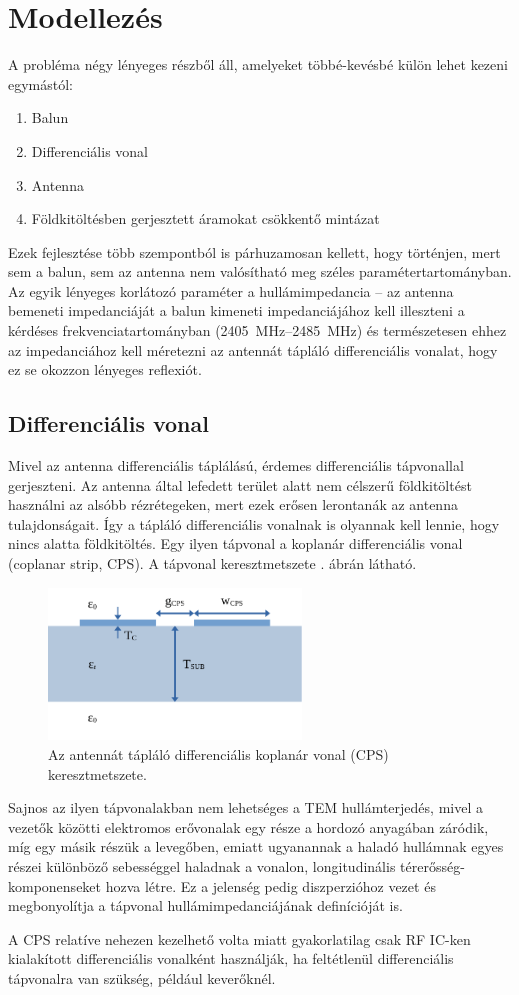 \chapter{Modellezés}
A probléma négy lényeges részből áll, amelyeket többé-kevésbé külön lehet kezeni egymástól:
\begin{enumerate}
	\item Balun
	\item Differenciális vonal
	\item Antenna
	\item Földkitöltésben gerjesztett áramokat csökkentő mintázat
\end{enumerate}
\par Ezek fejlesztése több szempontból is párhuzamosan kellett, hogy történjen, mert sem a balun, sem az antenna nem valósítható meg széles paramétertartományban. Az egyik lényeges korlátozó paraméter a hullámimpedancia -- az antenna bemeneti impedanciáját a balun kimeneti impedanciájához kell illeszteni a kérdéses frekvenciatartományban (\SIrange{2405}{2485}{MHz}) és természetesen ehhez az impedanciához kell méretezni az antennát tápláló differenciális vonalat, hogy ez se okozzon lényeges reflexiót.
\section{Differenciális vonal}
Mivel az antenna differenciális táplálású, érdemes differenciális tápvonallal gerjeszteni. Az antenna által lefedett terület alatt nem célszerű földkitöltést használni az alsóbb rézrétegeken, mert ezek erősen lerontanák az antenna tulajdonságait. Így a tápláló differenciális vonalnak is olyannak kell lennie, hogy nincs alatta földkitöltés. Egy ilyen tápvonal a koplanár differenciális vonal (coplanar strip, CPS). A tápvonal keresztmetszete . ábrán látható.
\begin{figure}[h]
	\centering
	\includegraphics[width=0.6\textwidth]{kep/cps.pdf}
	\caption{Az antennát tápláló differenciális koplanár vonal (CPS) keresztmetszete.}
	\label{fig:cps}
\end{figure}
\par Sajnos az ilyen tápvonalakban nem lehetséges a TEM hullámterjedés, mivel a vezetők közötti elektromos erővonalak egy része a hordozó anyagában záródik, míg egy másik részük a levegőben, emiatt ugyanannak a haladó hullámnak egyes részei különböző sebességgel haladnak a vonalon, longitudinális térerősség-komponenseket hozva létre. Ez a jelenség pedig diszperzióhoz vezet és megbonyolítja a tápvonal hullámimpedanciájának definícióját is.
\par A CPS relatíve nehezen kezelhető volta miatt gyakorlatilag csak RF IC-ken kialakított differenciális vonalként használják, ha feltétlenül differenciális tápvonalra van szükség, például keverőknél.
